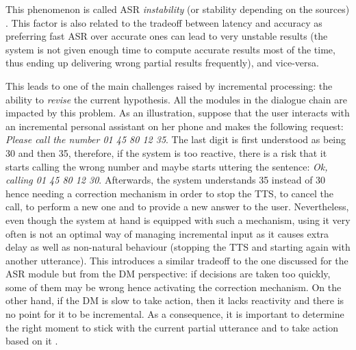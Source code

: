                                                  This phenomenon is called ASR \textit{instability} (or stability depending on the sources) \cite{Selfridge2011}. This factor is also related to the tradeoff between latency and accuracy as preferring fast ASR over accurate ones can lead to very unstable results (the system is not given enough time to compute accurate results most of the time, thus ending up delivering wrong partial results frequently), and vice-versa.
                                                  
This leads to one of the main challenges raised by incremental processing: the ability to \textit{revise} the current hypothesis. All the modules in the dialogue chain are impacted by this problem. As an illustration, suppose that the user interacts with an incremental personal assistant on her phone and makes the following request: \textit{Please call the number 01 45 80 12 35}. The last digit is first understood as being 30 and then 35, therefore, if the system is too reactive, there is a risk that it starts calling the wrong number and maybe starts uttering the sentence: \textit{Ok, calling 01 45 80 12 30}. Afterwards, the system understands 35 instead of 30 hence needing a correction mechanism in order to stop the TTS, to cancel the call, to perform a new one and to provide a new answer to the user. Nevertheless, even though the system at hand is equipped with such a mechanism, using it very often is not an optimal way of managing incremental input as it causes extra delay as well as non-natural behaviour (stopping the TTS and starting again with another utterance). This introduces a similar tradeoff to the one discussed for the ASR module but from the DM perspective: if decisions are taken too quickly, some of them may be wrong hence activating the correction mechanism. On the other hand, if the DM is slow to take action, then it lacks reactivity and there is no point for it to be incremental. As a consequence, it is important to determine the right moment to stick with the current partial utterance and to take action based on it \cite{Raux2008,Lu2011}.


